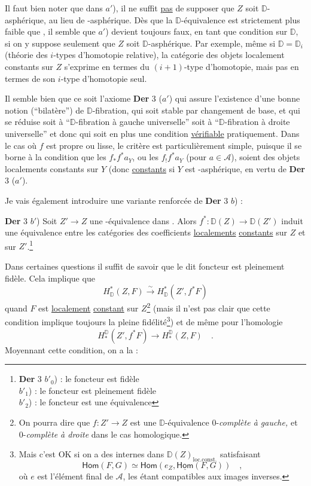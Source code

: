 \documentclass[11pt,leqno]{article}
\newcommand{\printedpage}[1]{\marginpar{\footnotesize p.~#1}}
\newcommand{\msp}[1]{\marginpar{\footnotesize [#1]}}
\newcommand{\DD}{\mathbb{D}}
\newcommand{\Dia}{\mathsf{Dia}}
\newcommand{\Hom}{\mathsf{Hom}}
\newcommand{\Hot}{\mathsf{Hot}}
\begin{document}
Il faut bien noter que dans $a'$), il ne suffit \underline{pas} de supposer que $Z$ soit $\DD$-asphérique, au lieu de \Hot-asphérique. Dès que la $\DD$-équivalence est strictement plus faible que \Hot, il semble que $a'$) devient toujours faux, en tant que condition sur $\DD$, si on y suppose seulement que $Z$ soit $\DD$-asphérique. Par exemple, même si $\DD = \DD_i$ (théorie des $i$-types d’homotopie relative), la catégorie
\msp{page 98}
des objets localement constants sur $Z$ s’exprime en termes du $(i+1)$-type d’homotopie, mais pas en termes de son $i$-type d’homotopie seul.

Il semble bien que ce soit l’axiome \textbf{Der} 3 ($a'$) qui assure l’existence d’une bonne notion (“bilatère”) de $\DD$-fibration, qui soit stable par changement de base, et qui se réduise soit
\printedpage{60}
à “$\DD$-fibration à gauche universelle” soit à “$\DD$-fibration à droite universelle” et donc qui soit en plus une condition \underline{vérifiable} pratiquement. Dans le cas où $f$ est propre ou lisse, le critère est particulièrement simple, puisque il se borne à la condition que les $f_* f^* a_Y$, ou les $f_! f^* a_Y$ (pour $a \in \mathcal{A}$), soient des objets localements constants sur $Y$ (donc \underline{constants} si $Y$ est \underline{\underline{\Hot}}-asphérique, en vertu de \textbf{Der} 3 ($a'$). %

Je vais également introduire une variante renforcée de \textbf{Der} 3 $b$) :

\textbf{Der} 3 $b'$) Soit $Z' \to Z$ une \Hot-équivalence dans \Dia. Alors $f^* : \DD(Z) \to \DD(Z')$ induit une équivalence entre les catégories des coefficients \underline{localements} \underline{constants} sur $Z$ et sur $Z'$.\footnote[50]{\textbf{Der} 3 $b'_0$) : le foncteur est fidèle\\
\hspace*{6em}$b'_1$) : le foncteur est pleinement fidèle\\
\hspace*{6em}$b'_2$) : le foncteur est une équivalence} %

\msp{page 99}
Dans certaines questions il suffit de savoir que le dit foncteur est pleinement fidèle. Cela implique que
\[
H^*_{\DD}(Z,F) \overset{\sim}{\longrightarrow} H^*_{\DD}(Z', f^*F)
\]
quand $F$ est \underline{localement} \underline{constant} sur $Z$\footnote[51]{On pourra dire que $f : Z' \to Z$ est une $\DD$-équivalence 0-\textit{complète à gauche,} et 0-\textit{complète à droite} dans le cas homologique.} (mais il n’est pas clair que cette condition implique toujours la pleine fidélité\footnote[52]{Mais c’est OK si on a des \underline{\Hom} internes dans $\DD(Z)_{\mathrm{loc.const.}}$ satisfaisant
\[
\Hom(F,G) \simeq \Hom(e_Z, \underline{\Hom}(F,G)) \quad ,
\]
où $e$ est l’élément final de $\mathcal{A}$, les \underline{\Hom} étant compatibles aux images inverses.}) et de même pour l’homologie
\[
H_*^{\DD}(Z', f^*F) \longrightarrow H_*^{\DD}(Z,F) \quad .
\]
Moyennant cette condition, on a la :
\end{document}
